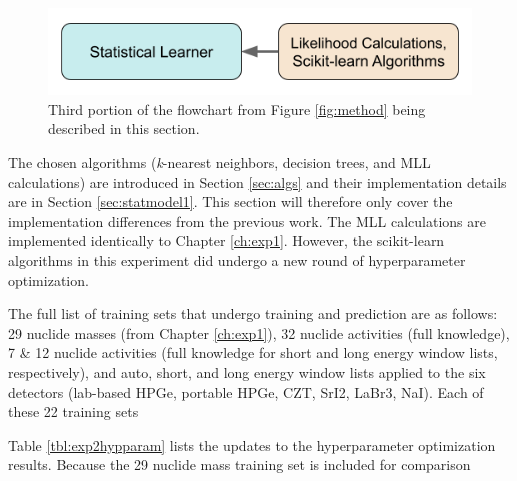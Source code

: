
\begin{figure}[H]
  \centering
  \includegraphics[width=0.7\linewidth]{./chapters/exp1/methodology3.png}
  \caption{Third portion of the flowchart from Figure \ref{fig:method} being 
           described in this section.}
\end{figure}

The chosen algorithms (\textit{k}-nearest neighbors, decision trees, and
\gls{MLL} calculations) are introduced in Section \ref{sec:algs} and their
implementation details are in Section \ref{sec:statmodel1}.  This section will
therefore only cover the implementation differences from the previous work.
The \gls{MLL} calculations are implemented identically to Chapter
\ref{ch:exp1}.  However, the scikit-learn algorithms in this experiment did
undergo a new round of hyperparameter optimization.

The full list of training sets that undergo training and prediction are as
follows: 29 nuclide masses (from Chapter \ref{ch:exp1}), 32 nuclide activities
(full knowledge), 7 \& 12 nuclide activities (full knowledge for short and long
energy window lists, respectively), and auto, short, and long energy window
lists applied to the six detectors (lab-based \gls{HPGe}, portable \gls{HPGe},
\gls{CZT}, \gls{SrI2}, \gls{LaBr3}, \gls{NaI}). Each of these 22 training sets

Table \ref{tbl:exp2hypparam} lists the updates to the hyperparameter
optimization results. Because the 29 nuclide mass training set is included for
comparison 

